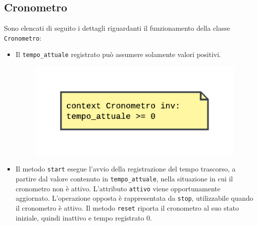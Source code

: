 \documentclass[11pt, a4paper]{article}
\theoremstyle{definition} %
\begin{document}
\newpage
\subsection{Cronometro}
Sono elencati di seguito i dettagli riguardanti il funzionamento della
classe \texttt{Cronometro}:
\begin{itemize}
    \item Il \texttt{tempo\_attuale} registrato può assumere solamente
    valori positivi.

    \begin{figure}[H]
    \centering
    \includegraphics[scale = 1]{materiale/ocl-tempo.pdf}
    \end{figure}

    \item Il metodo \texttt{start} esegue l'avvio della registrazione
    del tempo trascorso, a partire dal valore contenuto in
    \texttt{tempo\_attuale}, nella situazione in cui il cronometro non è
    attivo. L'attributo \texttt{attivo} viene opportunamente aggiornato.
    L'operazione opposta è rappresentata da \texttt{stop}, utilizzabile
    quando il cronometro è attivo. Il
    metodo \texttt{reset} riporta il cronometro al suo stato iniziale,
    quindi inattivo e tempo registrato 0.


\end{itemize}
\end{document}
